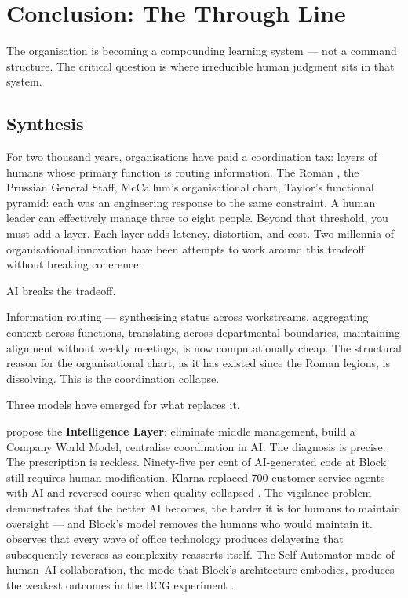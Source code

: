 \chapter{Conclusion: The Through Line}
\label{ch:conclusion}

\epigraph{The organisation is becoming a compounding learning system --- not a command structure. The critical question is where irreducible human judgment sits in that system.}{}

\section{Synthesis}

For two thousand years, organisations have paid a coordination tax: layers of humans whose primary function is routing information. The Roman , the Prussian General Staff, McCallum's organisational chart, Taylor's functional pyramid: each was an engineering response to the same constraint. A human leader can effectively manage three to eight people. Beyond that threshold, you must add a layer. Each layer adds latency, distortion, and cost. Two millennia of organisational innovation have been attempts to work around this tradeoff without breaking coherence.

AI breaks the tradeoff.

Information routing --- synthesising status across workstreams, aggregating context across functions, translating across departmental boundaries, maintaining alignment without weekly meetings, is now computationally cheap. The structural reason for the organisational chart, as it has existed since the Roman legions, is dissolving. This is the coordination collapse.

Three models have emerged for what replaces it.

\textcite{DorseyBotha2026} propose the \textbf{Intelligence Layer}: eliminate middle management, build a Company World Model, centralise coordination in AI. The diagnosis is precise. The prescription is reckless. Ninety-five per cent of AI-generated code at Block still requires human modification. Klarna replaced 700 customer service agents with AI and reversed course when quality collapsed \parencite{Klarna2025}. The vigilance problem \parencite{DellAcqua2023} demonstrates that the better AI becomes, the harder it is for humans to maintain oversight --- and Block's model removes the humans who would maintain it. \textcite{Spicer2026} observes that every wave of office technology produces delayering that subsequently reverses as complexity reasserts itself. The Self-Automator mode of human--AI collaboration, the mode that Block's architecture embodies, produces the weakest outcomes in the BCG experiment \parencite{Randazzo2024}.

